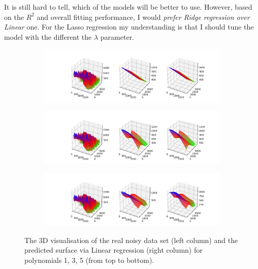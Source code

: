 It is still hard to tell, which of the models will be better to use. However, based on the $R^2$ and overall fitting performance, I would \textit{prefer Ridge regression over Linear} one. For the Lasso regression my understanding is that I should tune the model with the different the $\lambda$ parameter.

 
 
 \begin{figure}[!htbp]
\begin{subfigure}{\textwidth}
  \centering
  \includegraphics[width=1\linewidth]{images/surf/real_linear_p01_nreal.png}
\end{subfigure}
\begin{subfigure}{\textwidth}
  \centering
  \includegraphics[width=1\linewidth]{images/surf/real_linear_p03_nreal.png}
\end{subfigure}
\begin{subfigure}{\textwidth}
  \centering
  \includegraphics[width=1\linewidth]{images/surf/real_linear_p05_nreal.png}
\end{subfigure}
\caption{The 3D visualisation of the real noisy data set (left column) and the predicted surface via Linear regression (right column) for polynomials 1, 3, 5 (from top to bottom).}
\label{fig:linear-surf-real}
\end{figure}

